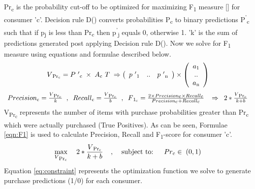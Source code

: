 Pr\textsubscript{c} is the probability cut-off to be optimized for maximizing F\textsubscript{1} measure [\cite{lipton2014optimal}]
for consumer 'c'. Decision rule D() converts probabilities P\textsubscript{c} to binary predictions 
P\textsuperscript{'}\textsubscript{c} such that if p\textsubscript{j} is less than 
Pr\textsubscript{c} then p\textsuperscript{'}\textsubscript{j} equals 0, otherwise 1.
'k' is the sum of predictions generated post applying Decision rule D(). Now we solve for F\textsubscript{1} measure
using equations and formulae described below.
  \begin{equation}
    \begin{array}{l}
      V\textsubscript{Pr\textsubscript{c}} = 
      P\textsuperscript{'}\textsubscript{c}
      \;\times\; A\textsubscript{c}\textsuperscript{T}
      \;
      \Rightarrow	
      \left( \begin{array}{ccc}
      p\textsuperscript{'}\textsubscript{1} & .. & 
      p\textsuperscript{'}\textsubscript{n}
      \end{array} \right)
      \times
      \left( \begin{array}{ccc}
      a\textsubscript{1} \\
      .. \\
      a\textsubscript{n} \\
      \end{array} \right)
    \end{array}
    \label{eqn:probability}
  \end{equation}
  \begin{equation}
    \begin{array}{l}
      Precision\textsubscript{c}= \frac{V\textsubscript{Pr\textsubscript{c}}} {k}
      \;\;,\;\;
      Recall\textsubscript{c}= \frac{V\textsubscript{Pr\textsubscript{c}}} {b}
      \;\;,\;\;
      F\textsubscript{1\textsubscript{c}} = \frac{2 \times Precision\textsubscript{c} 
      \times Recall\textsubscript{c}} 
      {Precision\textsubscript{c} + Recall\textsubscript{c}}
      \;
      \;\; \Rightarrow	\;\;
      2 * 
      \frac{
        V\textsubscript{Pr\textsubscript{c}}
      }
      {
        k + b
      }
    \end{array}
    \label{eqn:F1}
  \end{equation}
V\textsubscript{Pr\textsubscript{c}} represents the number of items with purchase 
probabilities greater than Pr\textsubscript{c} which were actually purchased (True Positives). 
As can be seen, Formulae \ref{eqn:F1} is used to calculate Precision, Recall and 
F\textsubscript{1}-score for consumer 'c'. 
  \begin{equation}
    \max_{V\textsubscript{Pr\textsubscript{c}}} \;\;\;\; 2 * \frac{ V\textsubscript{Pr\textsubscript{c}}}{k + b}
    \;\;\;\;,\;\;\;\;  \text{subject to: } \;\;\;\;  Pr\textsubscript{c}  \in \; (0,1)
    \label{eq:constraint}
  \end{equation}
Equation \ref{eq:constraint} represents the optimization function we solve to generate purchase predictions (1/0) for each consumer.

